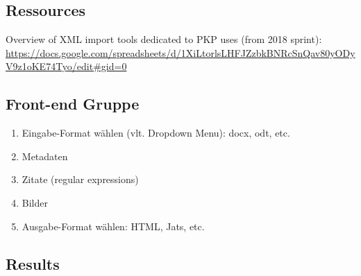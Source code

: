 \documentclass{article}
\begin{document}
\subsection[{Ressources}]{\label{wu30zlf94kvp}Ressources}
Overview of XML import tools dedicated to PKP uses (from 2018 sprint): \url{https://docs.google.com/spreadsheets/d/1XiLtorlsLHFJZzbkBNRcSnQav80yODyV9z1oKE74Tyo/edit\#gid=0}
\subsection{Front-end Gruppe}
\begin{enumerate}
\item Eingabe-Format wählen (vlt. Dropdown Menu): docx, odt, etc.
\item Metadaten
\item Zitate (regular expressions)
\item Bilder
\item Ausgabe-Format wählen: HTML, Jats, etc. 
\end{enumerate}
\subsection[{Results}]{\label{mvi15gtcieym}Results}
\end{document}
